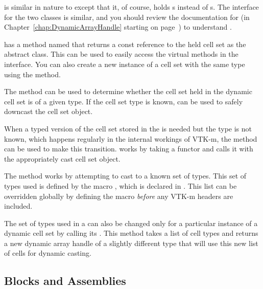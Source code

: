  is similar in nature to
 except that it, of course, holds
s instead of s. The
interface for the two classes is similar, and you should review the
documentation for  (in
Chapter~\ref{chap:DynamicArrayHandle} starting on
page~\pageref{chap:DynamicArrayHandle}) to understand
.

 has a method named  that
returns a const reference to the held cell set as the abstract
 class. This can be used to easily access the
virtual methods in the  interface. You can also
create a new instance of a cell set with the same type using the
 method.

The  method can be used
to determine whether the cell set held in the dynamic cell set is of a
given type. If the cell set type is known,
 can be used to safely
downcast the cell set object.

When a typed version of the cell set stored in the
 is needed but the type is not known, which
happens regularly in the internal workings of VTK-m, the
 method can be used to make this transition.
 works by taking a functor and calls it with the
appropriately cast cell set object.

The  method works by attempting to cast to a known
set of types. This set of types used is defined by the macro
, which is declared in
. This list can be overridden
globally by defining the 
macro \emph{before} any VTK-m headers are included.

The set of types used in a  can also be changed only
for a particular instance of a dynamic cell set by calling its
. This method takes a list of cell types and
returns a new dynamic array handle of a slightly different type that will
use this new list of cells for dynamic casting.


\subsection{Blocks and Assemblies}

